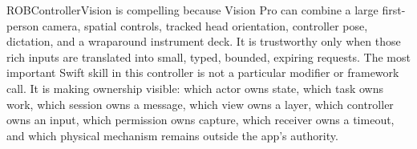 {}\markdownRendererInterblockSeparator
{}
\markdownRendererSectionEnd \markdownRendererSectionBegin
{}\markdownRendererInterblockSeparator
{}ROBControllerVision is compelling because Vision Pro can combine a large first-person camera, spatial controls, tracked head orientation, controller pose, dictation, and a wraparound instrument deck. It is trustworthy only when those rich inputs are translated into small, typed, bounded, expiring requests.\markdownRendererParagraphSeparator
{}The most important Swift skill in this controller is not a particular modifier or framework call. It is making ownership visible: which actor owns state, which task owns work, which session owns a message, which view owns a layer, which controller owns an input, which permission owns capture, which receiver owns a timeout, and which physical mechanism remains outside the app's authority.
\markdownRendererSectionEnd \markdownRendererDocumentEnd